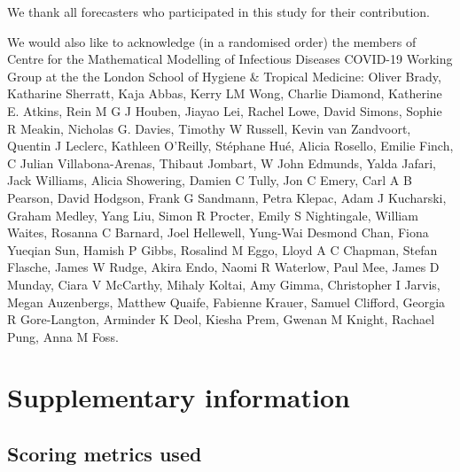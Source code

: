\documentclass[
]{article}
\begin{document}
We thank all forecasters who participated in this study for their contribution.

We would also like to acknowledge (in a randomised order) the members of Centre for the Mathematical Modelling of Infectious Diseases COVID-19 Working Group at the the London School of Hygiene \& Tropical Medicine: Oliver Brady, Katharine Sherratt, Kaja Abbas, Kerry LM Wong, Charlie Diamond, Katherine E. Atkins, Rein M G J Houben, Jiayao Lei, Rachel Lowe, David Simons, Sophie R Meakin, Nicholas G. Davies, Timothy W Russell, Kevin van Zandvoort, Quentin J Leclerc, Kathleen O'Reilly, Stéphane Hué, Alicia Rosello, Emilie Finch, C Julian Villabona-Arenas, Thibaut Jombart, W John Edmunds, Yalda Jafari, Jack Williams, Alicia Showering, Damien C Tully, Jon C Emery, Carl A B Pearson, David Hodgson, Frank G Sandmann, Petra Klepac, Adam J Kucharski, Graham Medley, Yang Liu, Simon R Procter, Emily S Nightingale, William Waites, Rosanna C Barnard, Joel Hellewell, Yung-Wai Desmond Chan, Fiona Yueqian Sun, Hamish P Gibbs, Rosalind M Eggo, Lloyd A C Chapman, Stefan Flasche, James W Rudge, Akira Endo, Naomi R Waterlow, Paul Mee, James D Munday, Ciara V McCarthy, Mihaly Koltai, Amy Gimma, Christopher I Jarvis, Megan Auzenbergs, Matthew Quaife, Fabienne Krauer, Samuel Clifford, Georgia R Gore-Langton, Arminder K Deol, Kiesha Prem, Gwenan M Knight, Rachael Pung, Anna M Foss.

\clearpage

\setcounter{table}{0}  \renewcommand{\thetable}{S\arabic{table}} \setcounter{figure}{0} \renewcommand{\thefigure}{S\arabic{figure}}

\hypertarget{appendix-supplementary-information}{%
\appendix}


\hypertarget{supplementary-information}{%
\section{Supplementary information}\label{supplementary-information}}

\hypertarget{scoring-metrics-used}{%
\subsection{Scoring metrics used}\label{scoring-metrics-used}}
\end{document}
